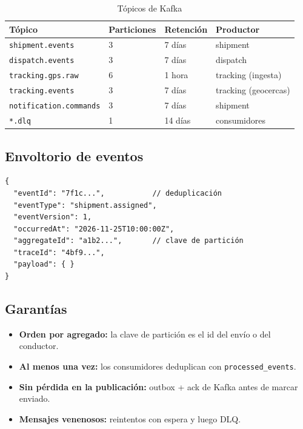\documentclass[conference]{IEEEtran}
\newcommand{\pkg}[1]{\texttt{#1}}
\begin{document}
\begin{table}[t]
\centering
\caption{Tópicos de Kafka}
\small
\begin{tabular}{@{}L{5cm}L{2.2cm}L{2.4cm}L{5.2cm}@{}}
\toprule
\textbf{Tópico} & \textbf{Particiones} & \textbf{Retención} & \textbf{Productor}\\
\midrule
\pkg{shipment.events} & 3 & 7 días & shipment\\
\pkg{dispatch.events} & 3 & 7 días & dispatch\\
\pkg{tracking.gps.raw} & 6 & 1 hora & tracking (ingesta)\\
\pkg{tracking.events} & 3 & 7 días & tracking (geocercas)\\
\pkg{notification.commands} & 3 & 7 días & shipment\\
\pkg{*.dlq} & 1 & 14 días & consumidores\\
\bottomrule
\end{tabular}
\end{table}

\subsection{Envoltorio de eventos}

\begin{verbatim}
{
  "eventId": "7f1c...",           // deduplicación
  "eventType": "shipment.assigned",
  "eventVersion": 1,
  "occurredAt": "2026-11-25T10:00:00Z",
  "aggregateId": "a1b2...",       // clave de partición
  "traceId": "4bf9...",
  "payload": { }
}
\end{verbatim}

\subsection{Garantías}

\begin{itemize}[leftmargin=1.2cm]
  \item \textbf{Orden por agregado:} la clave de partición es el id del envío o del conductor.
  \item \textbf{Al menos una vez:} los consumidores deduplican con \pkg{processed\_events}.
  \item \textbf{Sin pérdida en la publicación:} outbox + ack de Kafka antes de marcar enviado.
  \item \textbf{Mensajes venenosos:} reintentos con espera y luego DLQ.
\end{itemize}

\clearpage
\end{document}
